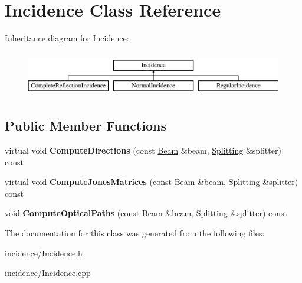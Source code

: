\hypertarget{class_incidence}{}\section{Incidence Class Reference}
\label{class_incidence}
Inheritance diagram for Incidence\+:\begin{figure}[H]
\begin{center}
\leavevmode
\includegraphics[height=2.000000cm]{class_incidence}
\end{center}
\end{figure}
\subsection*{Public Member Functions}
\begin{DoxyCompactItemize}
\item 
\mbox{\label{class_incidence_a50f20772debe743429ffbc2236aa2277}} 
virtual void {\bfseries Compute\+Directions} (const \mbox{\hyperlink{class_beam}{Beam}} \&beam, \mbox{\hyperlink{class_splitting}{Splitting}} \&splitter) const
\item 
\mbox{\label{class_incidence_aff3006cc4f95681a3dd92bcd971dca62}} 
virtual void {\bfseries Compute\+Jones\+Matrices} (const \mbox{\hyperlink{class_beam}{Beam}} \&beam, \mbox{\hyperlink{class_splitting}{Splitting}} \&splitter) const
\item 
\mbox{\label{class_incidence_aeb94474ae1bf08abaf3c18e0500b96bd}} 
void {\bfseries Compute\+Optical\+Paths} (const \mbox{\hyperlink{class_beam}{Beam}} \&beam, \mbox{\hyperlink{class_splitting}{Splitting}} \&splitter) const
\end{DoxyCompactItemize}


The documentation for this class was generated from the following files\+:\begin{DoxyCompactItemize}
\item 
incidence/Incidence.\+h\item 
incidence/Incidence.\+cpp\end{DoxyCompactItemize}
